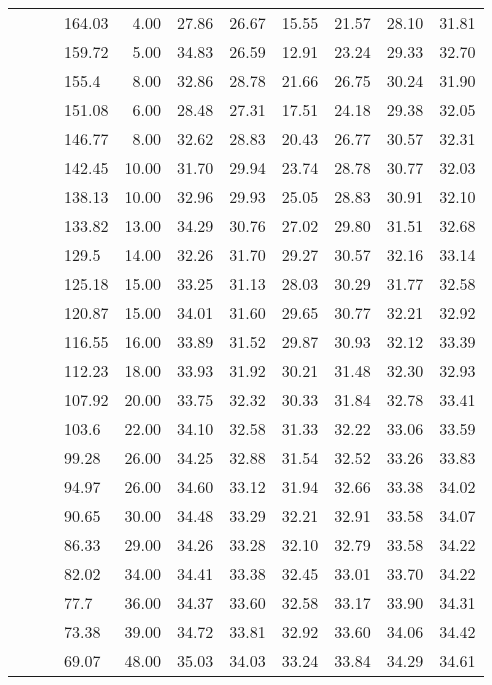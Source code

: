 \begin{longtable}{llllrrrrrrr}
   &  &  & 164.03 & 4.00 & 27.86 & 26.67 & 15.55 & 21.57 & 28.10 & 31.81 \\ 
   &  &  & 159.72 & 5.00 & 34.83 & 26.59 & 12.91 & 23.24 & 29.33 & 32.70 \\ 
   &  &  & 155.4 & 8.00 & 32.86 & 28.78 & 21.66 & 26.75 & 30.24 & 31.90 \\ 
   &  &  & 151.08 & 6.00 & 28.48 & 27.31 & 17.51 & 24.18 & 29.38 & 32.05 \\ 
   &  &  & 146.77 & 8.00 & 32.62 & 28.83 & 20.43 & 26.77 & 30.57 & 32.31 \\ 
   &  &  & 142.45 & 10.00 & 31.70 & 29.94 & 23.74 & 28.78 & 30.77 & 32.03 \\ 
   &  &  & 138.13 & 10.00 & 32.96 & 29.93 & 25.05 & 28.83 & 30.91 & 32.10 \\ 
   &  &  & 133.82 & 13.00 & 34.29 & 30.76 & 27.02 & 29.80 & 31.51 & 32.68 \\ 
   &  &  & 129.5 & 14.00 & 32.26 & 31.70 & 29.27 & 30.57 & 32.16 & 33.14 \\ 
   &  &  & 125.18 & 15.00 & 33.25 & 31.13 & 28.03 & 30.29 & 31.77 & 32.58 \\ 
   &  &  & 120.87 & 15.00 & 34.01 & 31.60 & 29.65 & 30.77 & 32.21 & 32.92 \\ 
   &  &  & 116.55 & 16.00 & 33.89 & 31.52 & 29.87 & 30.93 & 32.12 & 33.39 \\ 
   &  &  & 112.23 & 18.00 & 33.93 & 31.92 & 30.21 & 31.48 & 32.30 & 32.93 \\ 
   &  &  & 107.92 & 20.00 & 33.75 & 32.32 & 30.33 & 31.84 & 32.78 & 33.41 \\ 
   &  &  & 103.6 & 22.00 & 34.10 & 32.58 & 31.33 & 32.22 & 33.06 & 33.59 \\ 
   &  &  & 99.28 & 26.00 & 34.25 & 32.88 & 31.54 & 32.52 & 33.26 & 33.83 \\ 
   &  &  & 94.97 & 26.00 & 34.60 & 33.12 & 31.94 & 32.66 & 33.38 & 34.02 \\ 
   &  &  & 90.65 & 30.00 & 34.48 & 33.29 & 32.21 & 32.91 & 33.58 & 34.07 \\ 
   &  &  & 86.33 & 29.00 & 34.26 & 33.28 & 32.10 & 32.79 & 33.58 & 34.22 \\ 
   &  &  & 82.02 & 34.00 & 34.41 & 33.38 & 32.45 & 33.01 & 33.70 & 34.22 \\ 
   &  &  & 77.7 & 36.00 & 34.37 & 33.60 & 32.58 & 33.17 & 33.90 & 34.31 \\ 
   &  &  & 73.38 & 39.00 & 34.72 & 33.81 & 32.92 & 33.60 & 34.06 & 34.42 \\ 
   &  &  & 69.07 & 48.00 & 35.03 & 34.03 & 33.24 & 33.84 & 34.29 & 34.61 \\ 

\end{longtable}
